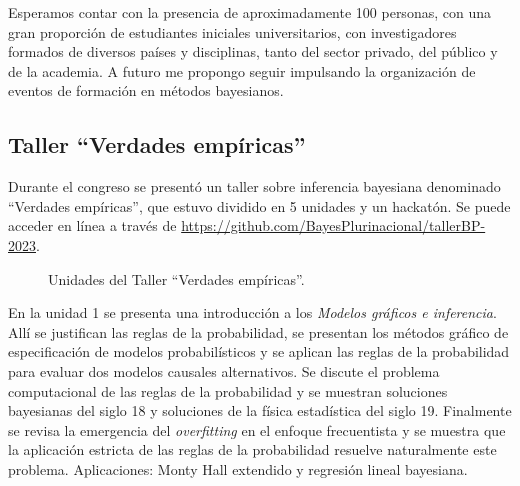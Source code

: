 \documentclass[a4paper,11pt]{book}
\theoremstyle{definition}
\begin{document}
Esperamos contar con la presencia de aproximadamente 100 personas, con una gran proporci\'on de estudiantes iniciales universitarios, con investigadores formados de diversos pa\'ises y disciplinas, tanto del sector privado, del p\'ublico y de la academia.
%
A futuro me propongo seguir impulsando la organizaci\'on de eventos de formaci\'on en m\'etodos bayesianos.

\subsection{Taller ``Verdades emp\'iricas''}

Durante el congreso se present\'o un taller sobre inferencia bayesiana denominado ``Verdades emp\'iricas'', que estuvo dividido en 5 unidades y un hackat\'on.
%
Se puede acceder en l\'inea a trav\'es de \url{https://github.com/BayesPlurinacional/tallerBP-2023}.


\begin{figure}[ht!]
\centering
  \begin{subfigure}[b]{0.32\textwidth} \centering
  \end{subfigure}
  \hfill
  \begin{subfigure}[b]{0.32\textwidth} \centering
  \end{subfigure}
  \hfill
  \begin{subfigure}[b]{0.32\textwidth} \centering
  \end{subfigure}
  \hfill
  \begin{subfigure}[b]{0.32\textwidth} \centering
  \end{subfigure}
  \hfill
  \begin{subfigure}[b]{0.32\textwidth} \centering
  \end{subfigure}
  \hfill
  \begin{subfigure}[b]{0.32\textwidth} \centering
  \end{subfigure}
  \caption{Unidades del Taller ``Verdades emp\'iricas''.}
\end{figure}


En la unidad 1 se presenta una introducci\'on a los \emph{Modelos gr\'aficos e inferencia}.
%
All\'i se justifican las reglas de la probabilidad, se presentan los m\'etodos gr\'afico de especificaci\'on de modelos probabil\'isticos y se aplican las reglas de la probabilidad para evaluar dos modelos causales alternativos.
%
Se discute el problema computacional de las reglas de la probabilidad y se muestran soluciones bayesianas del siglo 18 y soluciones de la f\'isica estad\'istica del siglo 19.
%
Finalmente se revisa la emergencia del \emph{overfitting} en el enfoque frecuentista y se muestra que la aplicaci\'on estricta de las reglas de la probabilidad resuelve naturalmente este problema.
%
Aplicaciones: Monty Hall extendido y regresi\'on lineal bayesiana.
\end{document}
